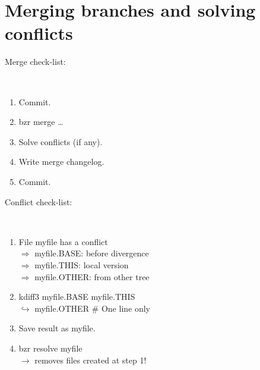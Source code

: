 \documentclass[tumble,foldmark,a4paper]{leaflet}
\begin{document}
\newpage

\section*{Merging branches and solving conflicts}

Merge check-list:
{\tt
\begin{enumerate}
 \item Commit.
 \item bzr merge \ldots
 \item Solve conflicts (if any).
 \item Write merge changelog.
 \item Commit.
\end{enumerate}
}

\begin{center}
\colorbox{warnbg}{}
\end{center}

\vspace{0.5em}

Conflict check-list:
{\tt
\begin{enumerate}
 \item File myfile has a conflict \\
  $\Longrightarrow$ myfile.BASE: before divergence \\
  $\Longrightarrow$ myfile.THIS: local version \\
  $\Longrightarrow$ myfile.OTHER: from other tree
 \item kdiff3 myfile.BASE myfile.THIS \\
  $\hookrightarrow$ myfile.OTHER \# One line only
 \item Save result as myfile.
 \item bzr resolve myfile \\
 $\longrightarrow$ removes files created at step 1!
\end{enumerate}
}

\begin{center}
\colorbox{warnbg}{}
\end{center}
\end{document}

